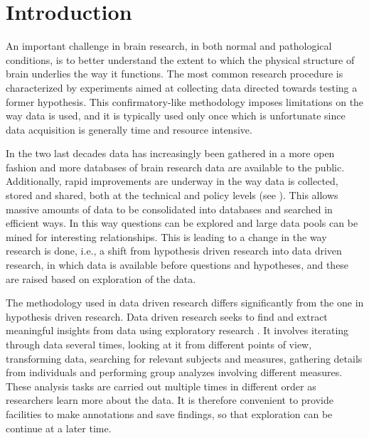 \documentclass[utf8,paper]{frontiersSCNS} %
\begin{document}




\section{Introduction}



An important challenge in brain research, in both normal and pathological conditions, is to better understand the extent to which the physical structure of brain underlies the way it functions. The most common research procedure is characterized by experiments aimed at collecting data directed towards testing a former hypothesis. This confirmatory-like methodology imposes limitations on the way data is used, and it is typically used only once which is unfortunate since data acquisition is generally time and resource intensive.
										
In the two last decades data has increasingly been gathered in a more open fashion and more databases of brain research data are available to the public. Additionally, rapid improvements are underway in the way data is collected, stored and shared, both at the technical and policy levels (see \cite{eckersley_neuroscience_2003}). This allows massive amounts of data to be consolidated into databases and searched in efficient ways. In this way questions can be explored and large data pools can be mined for interesting relationships. This is leading to a change in the way research is done, i.e., a shift from hypothesis driven research into data driven research, in which data is available before questions and hypotheses, and these are raised based on exploration of the data.


The methodology used in data driven research differs significantly from the one in hypothesis driven research. Data driven research seeks to find and extract meaningful insights from data using exploratory research \citep{tukey_we_1980}. It involves iterating through data several times, looking at it from different points of view, transforming data, searching for relevant subjects and measures, gathering details from individuals and performing group analyzes involving different measures. These analysis tasks are carried out multiple times in different order as researchers learn more about the data. It is therefore convenient to provide facilities to make annotations and save findings, so that exploration can be continue at a later time.
				
\end{document}
